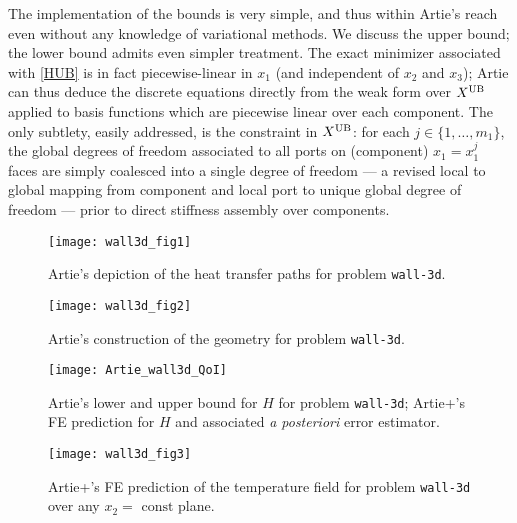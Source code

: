 \documentclass[preprint,12pt]{article}
\begin{document}
The implementation of the bounds is very simple, and thus within Artie's reach even without any knowledge of variational methods. We discuss the upper bound; the lower bound admits even simpler treatment. The exact minimizer associated with \eqref{HUB} is in fact piecewise-linear in $x_1$ (and independent of $x_2$ and $x_3$); Artie can thus deduce the discrete equations directly from the weak form over $X^{\rm UB}$ applied to basis functions which are piecewise linear over each component. The only subtlety, easily addressed, is the constraint in $X^{\rm UB}$: for each $j \in \{1,\ldots,m_1\}$, the global degrees of freedom associated to all ports on  (component) $x_1 = x_1^j$ faces are simply coalesced into a single degree of freedom --- a revised local to global mapping from component and local port to unique global degree of freedom --- prior to direct stiffness assembly over components.





\begin{figure}[h!]
\begin{center}
 \texttt{[image: wall3d\_fig1]}
\end{center}
\caption{Artie's depiction of the heat transfer paths for problem \texttt{wall-3d}.}
\label{fig:wall-3d_fig1}
\end{figure}

\begin{figure}[h!]
\begin{center}
 \texttt{[image: wall3d\_fig2]}
\end{center}
\caption{Artie's construction of the geometry for problem \texttt{wall-3d}.}
\label{fig:wall-3d_fig2}
\end{figure}

\begin{figure}[h!]
\vspace{.2in}
\begin{mdframed}
\begin{center}
 \texttt{[image: Artie\_wall3d\_QoI]}
\end{center}
\end{mdframed}
\vspace{-.1in}
\caption{Artie's lower and upper bound for $H$ for problem \texttt{wall-3d}; Artie+'s FE prediction for $H$ and associated {\it a posteriori} error estimator.}
\label{fig:wall-3d_fig4}
\end{figure}

\begin{figure}[h!]
\begin{center}
 \texttt{[image: wall3d\_fig3]}
\end{center}
\caption{Artie+'s FE prediction of the temperature field for problem \texttt{wall-3d} over any $x_2 = \text{ const}$ plane.}
\label{fig:wall-3d_fig3}
\end{figure}
\end{document}
